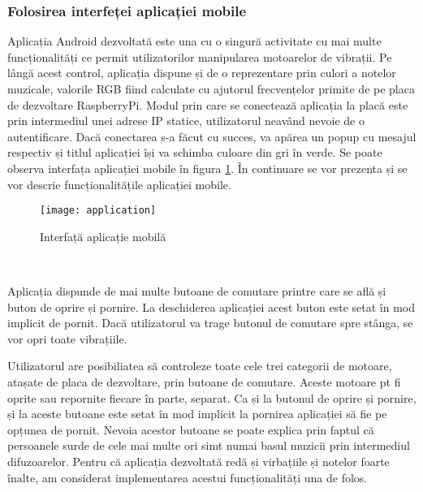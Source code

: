 \documentclass[../IoMusT.tex]{subfiles}
\begin{document}
\subsubsection{Folosirea interfeței aplicației mobile}
Aplicația Android dezvoltată este una cu o singură activitate cu mai multe funcționalități ce permit utilizatorilor manipularea motoarelor de vibrații.
 Pe lângă acest control, aplicația dispune și de o reprezentare prin culori a notelor muzicale, valorile RGB fiind calculate cu ajutorul frecvențelor primite de pe placa de dezvoltare RaspberryPi. Modul prin care se conectează aplicația la placă este prin intermediul unei adrese IP statice, utilizatorul neavând nevoie de o autentificare. Dacă conectarea s-a făcut cu succes, va apărea un popup cu mesajul respectiv și titlul aplicației își va schimba culoare din gri în verde. Se poate observa interfața aplicației mobile în figura \ref{fig:application}. În continuare se vor prezenta și se vor descrie funcționalitățile aplicației mobile.
\begin{figure}[h]
\begin{center}
\texttt{[image: application]}
\caption{Interfață aplicație mobilă}
\label{fig:application}
\end{center}
\end{figure}
\\
\par Aplicația dispunde de mai multe butoane de comutare printre care se află și buton de oprire și pornire. La deschiderea aplicației acest buton este setat în mod implicit de pornit. Dacă utilizatorul va trage butonul de comutare spre stânga, se vor opri toate vibrațiile.
\\ %
\par Utilizatorul are posibiliatea să controleze toate cele trei categorii de motoare, atașate de placa de dezvoltare, prin butoane de comutare. Aceste motoare pt fi oprite sau repornite fiecare în parte, separat. Ca și la butonul de oprire și pornire, și la aceste butoane este setat în mod implicit la pornirea aplicației să fie pe opțunea de pornit. Nevoia acestor butoane se poate explica prin faptul că persoanele surde de cele mai multe ori simt numai basul muzicii prin intermediul difuzoarelor. Pentru că aplicația dezvoltată redă și virbațiile și notelor foarte înalte, am considerat implementarea acestui funcționalități una de folos. 
\end{document}
